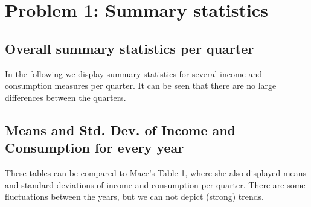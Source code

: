 \documentclass[12pt,a4paper]{article}
\begin{document}
\newpage


\section*{Problem 1: Summary statistics}

\subsection*{Overall summary statistics per quarter}

In the following we display summary statistics for several income and consumption measures per quarter. It can be seen that there are no large differences between the quarters. 

\begin{center}




\end{center}

\subsection*{Means and Std. Dev. of Income and Consumption for every year}

These tables can be compared to Mace's Table 1, where she also displayed means and standard deviations of income and consumption per quarter. There are some fluctuations between the years, but we can not depict (strong) trends.

\begin{center}
\\
\\
\\
\\
\\
\\
\\
\\
\\
\\
\\
\\
\\
\\
\\
\end{center}
\end{document}
